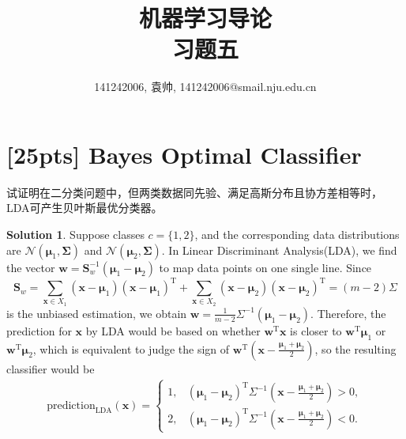 \documentclass[a4paper,UTF8]{article}
\numberwithin{equation}{section}
\theoremstyle{definition}
\newtheorem*{solution}{Solution}
\begin{document}
\title{机器学习导论\\
习题五}
\author{141242006, 袁帅, 141242006@smail.nju.edu.cn}
\maketitle
\section{[25pts] Bayes Optimal Classifier}
试证明在二分类问题中，但两类数据同先验、满足高斯分布且协方差相等时，LDA可产生贝叶斯最优分类器。
\begin{solution}
Suppose classes $c=\{1,2\}$, and the corresponding data distributions are $\mathcal{N}(\bm{\mu}_1, \bm{\Sigma})$ and $\mathcal{N}(\bm{\mu}_2, \bm{\Sigma})$. In Linear Discriminant Analysis(LDA), we find the vector $\bm{w}=\bm{S}_w^{-1}(\bm{\mu}_1-\bm{\mu}_2)$ to map data points on one single line. Since
\begin{equation}
\bm{S}_w=\sum_{\bm{x}\in X_1}(\bm{x}-\bm{\mu}_1)(\bm{x}-\bm{\mu}_1)^{\mathrm{T}}+\sum_{\bm{x}\in X_2}(\bm{x}-\bm{\mu}_2)(\bm{x}-\bm{\mu}_2)^{\mathrm{T}}=(m-2)\Sigma
\end{equation}
 is the unbiased estimation, we obtain $\bm{w}=\frac{1}{m-2}\Sigma^{-1}(\bm{\mu}_1-\bm{\mu}_2)$. Therefore, the prediction for $\bm{x}$ by LDA would be based on whether $\bm{w}^\mathrm{T}\bm{x}$ is closer to $\bm{w}^\mathrm{T}\bm{\mu}_1$ or $\bm{w}^\mathrm{T}\bm{\mu}_2$, which is equivalent to judge the sign of $\bm{w}^\mathrm{T}(\bm{x}-\frac{\bm{\mu}_1+\bm{\mu}_2}{2})$, so the resulting classifier would be
\begin{eqnarray}
\text{prediction}_{\text{LDA}}(\bm{x})=
\left\{
\begin{array}{ll}
1, &(\bm{\mu}_1-\bm{\mu}_2)^\mathrm{T}\Sigma^{-1}(\bm{x}-\frac{\bm{\mu}_1+\bm{\mu}_2}{2})>0,\\
2, &(\bm{\mu}_1-\bm{\mu}_2)^\mathrm{T}\Sigma^{-1}(\bm{x}-\frac{\bm{\mu}_1+\bm{\mu}_2}{2})<0.
\end{array}
\right.
\end{eqnarray}


\end{solution}
\end{document}
